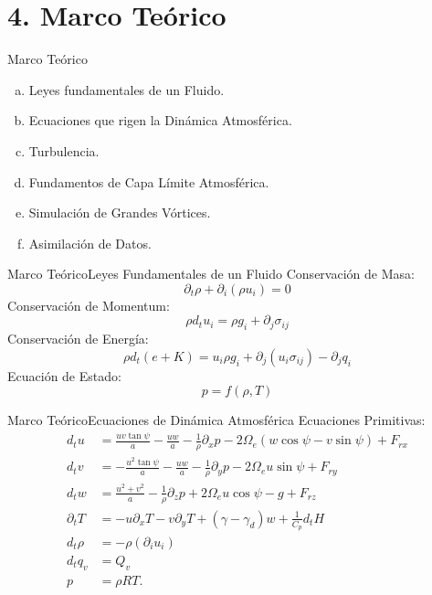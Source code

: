 \documentclass[mathserif,10pt]{beamer}
\newcommand{\be}{\begin{equation}}
\newcommand{\ee}{\end{equation}}
\begin{document}
\section{4. Marco Teórico}
\begin{frame}{Marco Teórico}
	\begin{enumerate}[a.]
		\item Leyes fundamentales de un Fluido.
		\item Ecuaciones que rigen la Dinámica Atmosférica.
		\item Turbulencia.
		\item Fundamentos de Capa Límite Atmosférica.
		\item Simulación de Grandes Vórtices.
		\item Asimilación de Datos.
	\end{enumerate}
\end{frame}

\begin{frame}{Marco Teórico}{Leyes Fundamentales de un Fluido}
	Conservación de Masa:
	\be \partial_t \rho + \partial_i(\rho u_i) = 0 \ee
	Conservación de Momentum:
	\be \rho d_t u_i = \rho g_i + \partial_j\sigma_{ij} \ee
	Conservación de Energía:
	\be \rho d_t\left( e+ K \right) = u_i\rho g_i + \partial_j(u_i \sigma_{ij}) - \partial_j q_i \ee
	Ecuación de Estado:
	\be p = f(\rho,T) \ee
\end{frame}
%

\begin{frame}{Marco Teórico}{Ecuaciones de Dinámica Atmosférica}
	Ecuaciones Primitivas:
	\small
	\begin{align}
	d_t u &= \frac{uv\tan\psi}{a}-\frac{uw}{a}-\frac{1}{\rho}\partial_x p - 2\Omega_e(w\cos\psi - v\sin\psi) + F_{rx}\\
	d_t v &= -\frac{u^2\tan\psi}{a}-\frac{uw}{a}-\frac{1}{\rho}\partial_y p - 2\Omega_e u\sin\psi + F_{ry}\\
	d_t w &= \frac{u^2 + v^2}{a}-\frac{1}{\rho}\partial_z p + 2\Omega_e u\cos\psi -g + F_{rz}\\
	\partial_t T &= -u\partial_x T -v\partial_y T + (\gamma-\gamma_d)w+\frac{1}{C_p}d_t H\\
	d_t \rho &= -\rho(\partial_i u_i)\\
	d_t q_v &= Q_v\label{03_eq:humedad}\\
	p &= \rho R T.
	\end{align}
	\normalsize
\end{frame}
\end{document}
